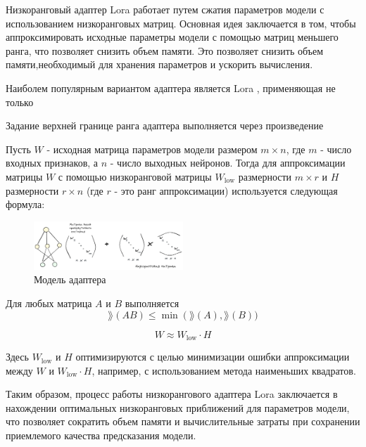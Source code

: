 Низкоранговый адаптер Lora работает путем сжатия 
параметров модели с использованием низкоранговых матриц. 
Основная идея заключается в том, 
чтобы аппроксимировать исходные параметры модели с
помощью матриц меньшего ранга, что позволяет снизить объем памяти.
Это позволяет снизить объем памяти,необходимый для хранения параметров и ускорить вычисления. 


Наиболем популярным вариантом адаптера является Lora \cite{hu2021lora}, применяющая не только 

Задание верхней границе ранга адаптера выполняется через произведение 

Пусть $W$ - исходная матрица параметров модели размером
 $m \times n$, где $m$ - число входных признаков, 
 а \( n \) - число выходных нейронов.
Тогда для аппроксимации матрицы $W$ с
помощью низкоранговой матрицы $W_{\text{low}}$
размерности \( m \times r \) и \( H \) размерности \( r \times n \) (где \( r \) - это ранг аппроксимации) используется следующая формула:



\begin{figure}[h]
    \centering
    \includegraphics[width=0.5\textwidth]{assets/ml/adapter/adapter.excalidraw.png}
    \caption{Модель адаптера \cite{stablediffusion}}
    \label{sd_learning}
\end{figure}



Для любых матрица $A$ и $B$ выполняется
$$
    \rang(𝐴𝐵) \le \min\left(\rang(𝐴),\rang(𝐵))
$$

$$
    W \approx W_{\text{low}} \cdot H
$$

Здесь \( W_{\text{low}} \) и \( H \) оптимизируются с целью минимизации ошибки аппроксимации между \( W \) и \( W_{\text{low}} \cdot H \), например, с использованием метода наименьших квадратов.

Таким образом, процесс работы низкорангового адаптера Lora заключается в нахождении оптимальных низкоранговых приближений для параметров модели, что позволяет сократить объем памяти и вычислительные затраты при сохранении приемлемого качества предсказания модели.
